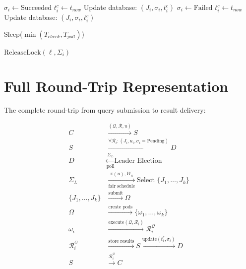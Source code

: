 \documentclass[11pt]{article}
\begin{document}
\begin{algorithmic}[1]
          \State $\sigma_i \gets \text{Succeeded}$
          \State $t_i^c \gets t_{now}$
          \State Update database: $(J_i, \sigma_i, t_i^c)$
          \State $\sigma_i \gets \text{Failed}$
          \State $t_i^c \gets t_{now}$
          \State Update database: $(J_i, \sigma_i, t_i^c)$
        \EndIf
      \EndFor
    \EndIf

    \State Sleep($\min(T_{check}, T_{poll})$)
  \EndWhile

  \State {}
    \State $\text{ReleaseLock}(\ell, \Sigma_i)$
  \EndIf
\EndProcedure
\end{algorithmic}

\newpage


\section{Full Round-Trip Representation}
\label{sec:full-round-trip}

The complete round-trip from query submission to result delivery:

\begin{equation}
\begin{split}
C &\xrightarrow{(\mathcal{Q}, \mathcal{R}, u)} S \\
S &\xrightarrow{\forall \mathcal{R}_i: (J_i, u_i, \sigma_i=\text{Pending})} D \\
D &\xleftarrow[\text{poll}]{\Sigma_L} \text{Leader Election} \\
\Sigma_L &\xrightarrow[\text{fair schedule}]{\pi(u), W_a} \text{Select } \{J_1, \ldots, J_k\} \\
\{J_1, \ldots, J_k\} &\xrightarrow{\text{submit}} \Omega \\
\Omega &\xrightarrow{\text{create pods}} \{\omega_1, \ldots, \omega_k\} \\
\omega_i &\xrightarrow{\text{execute}(\mathcal{Q}, \mathcal{R}_i)} \mathcal{R}_i^{\mathcal{Q}} \\
\mathcal{R}_i^{\mathcal{Q}} &\xrightarrow{\text{store results}} S \xrightarrow{\text{update}(t_i^c, \sigma_i)} D \\
S &\xrightarrow{\mathcal{R}_i^{\mathcal{Q}}} C
\end{split}
\end{equation}
\end{document}
